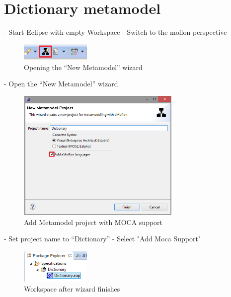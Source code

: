 \newpage
\newpage
\newpage
\section{Dictionary metamodel}

- Start Eclipse with empty Workspace
- Switch to the moflon perspective

\begin{figure}[htp]
\begin{center}
 \includegraphics[width=0.3\textwidth]{pics/moca/1DictionaryMetaModel/1-NewMetamodelWizard}
  \caption{Opening the ``New Metamodel'' wizard}
  \label{moca-1-NewMetamodelWizard}
\end{center}
\end{figure}

- Open the ``New Metamodel'' wizard 

\begin{figure}[htp]
\begin{center}
 \includegraphics[width=0.7\textwidth]{pics/moca/1DictionaryMetaModel/2-AddMocaSupport-ProjectName}
  \caption{Add Metamodel project with MOCA support}
  \label{moca-2-AddMocaSupport-ProjectName}
\end{center}
\end{figure}

- Set project name to ``Dictionary''
- Select "Add Moca Support" 


\begin{figure}[htp]
\begin{center}
 \includegraphics[width=0.3\textwidth]{pics/moca/1DictionaryMetaModel/3-WizardResult}
  \caption{Workspace after wizard finishes}
  \label{moca-3-WizardResult}
\end{center}
\end{figure}

